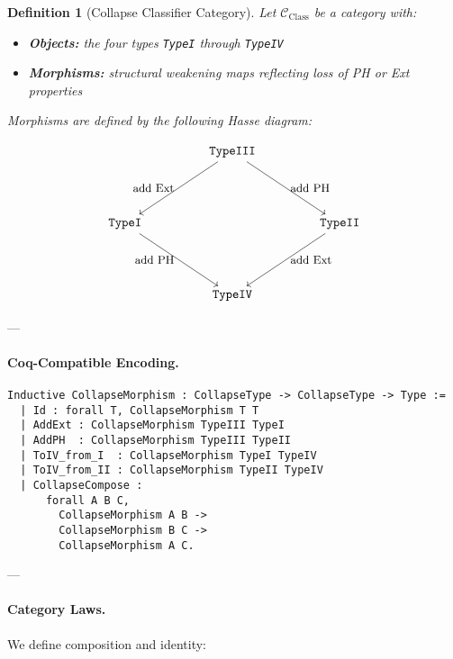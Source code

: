 \documentclass[11pt]{article}
\newtheorem{definition}[theorem]{Definition}
\begin{document}
\begin{definition}[Collapse Classifier Category]
Let \(\mathcal{C}_{\text{Class}}\) be a category with:

\begin{itemize}
  \item \textbf{Objects:} the four types \texttt{TypeI} through \texttt{TypeIV}
  \item \textbf{Morphisms:} structural weakening maps reflecting loss of PH or Ext properties
\end{itemize}

Morphisms are defined by the following Hasse diagram:

\[
\begin{tikzpicture}[node distance=2.5cm, auto]
  \node (A) at (3,4) {\texttt{TypeIII}};
  \node (B) at (0,2) {\texttt{TypeI}};
  \node (C) at (6,2) {\texttt{TypeII}};
  \node (D) at (3,0) {\texttt{TypeIV}};

  \draw[->] (A) -- (B) node[midway, left] {\small add Ext};
  \draw[->] (A) -- (C) node[midway, right] {\small add PH};
  \draw[->] (B) -- (D) node[midway, left] {\small add PH};
  \draw[->] (C) -- (D) node[midway, right] {\small add Ext};
\end{tikzpicture}
\]


\end{definition}

---

\paragraph{Coq-Compatible Encoding.}

\noindent
\begin{lstlisting}[language=Coq]
Inductive CollapseMorphism : CollapseType -> CollapseType -> Type :=
  | Id : forall T, CollapseMorphism T T
  | AddExt : CollapseMorphism TypeIII TypeI
  | AddPH  : CollapseMorphism TypeIII TypeII
  | ToIV_from_I  : CollapseMorphism TypeI TypeIV
  | ToIV_from_II : CollapseMorphism TypeII TypeIV
  | CollapseCompose :
      forall A B C,
        CollapseMorphism A B ->
        CollapseMorphism B C ->
        CollapseMorphism A C.
\end{lstlisting}

---

\paragraph{Category Laws.}

We define composition and identity:
\end{document}
